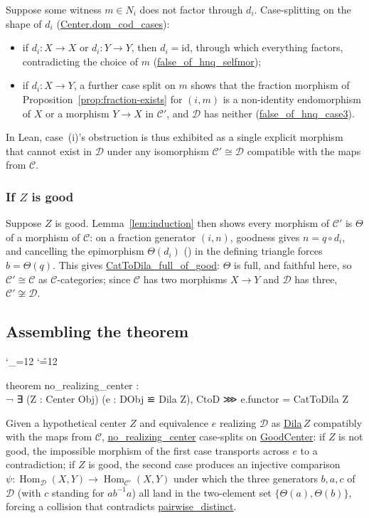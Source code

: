 \documentclass[11pt]{amsart}
\newcommand{\lc}[1]{\url{#1}}
\newenvironment{leancode}{%
  \begingroup
  \catcode`\_=12\relax
  \catcode`\^=12\relax
  \small\ttfamily\raggedright\baselineskip=1.15\baselineskip
  \par\smallskip\noindent
}{%
  \par\smallskip
  \endgroup
}
\theoremstyle{plain}
\theoremstyle{definition}
\theoremstyle{remark}
\newcommand{\calC}{\mathcal C}
\newcommand{\calD}{\mathcal D}
\newcommand{\id}{\mathrm{id}}
\DeclareMathOperator{\Hom}{Hom}
\begin{document}
Suppose some witness $m \in N_i$ does not factor through $d_i$. Case-splitting on the shape
of $d_i$ (\lc{Center.dom_cod_cases}):
\begin{itemize}
\item if $d_i : X\to X$ or $d_i:Y\to Y$, then $d_i = \id$, through which everything factors,
  contradicting the choice of $m$ (\lc{false_of_hnq_selfmor});
\item if $d_i : X \to Y$, a further case split on $m$ shows that the fraction morphism of
  Proposition~\ref{prop:fraction-exists} for $(i,m)$ is a non-identity endomorphism of $X$
  or a morphism $Y \to X$ in $\calC'$, and $\calD$ has neither (\lc{false_of_hnq_case3}).
\end{itemize}
In Lean, case~(i)'s obstruction is thus exhibited as a single explicit morphism that cannot
exist in $\calD$ under any isomorphism $\calC' \cong \calD$ compatible with the maps from
$\calC$.

\subsubsection{If $Z$ is good}

Suppose $Z$ is good. Lemma~\ref{lem:induction} then shows every morphism of $\calC'$ is
$\Theta$ of a morphism of $\calC$: on a fraction generator $(i,n)$, goodness gives
$n = q \circ d_i$, and cancelling the epimorphism $\Theta(d_i)$
(\citep[Proposition~3.3]{Mayeux}) in the defining triangle forces $b = \Theta(q)$. This
gives \lc{CatToDila_full_of_good}: $\Theta$ is full, and faithful here, so
$\calC' \cong \calC$ as $\calC$-categories; since $\calC$ has two morphisms $X \to Y$ and
$\calD$ has three, $\calC' \not\cong \calD$.

\subsection{Assembling the theorem}

\begin{leancode}
theorem no_realizing_center : \\
    ¬ ∃ (Z : Center Obj) (e : DObj ≌ Dila Z), CtoD ⋙ e.functor = CatToDila Z \\
\end{leancode}
Given a hypothetical center $Z$ and equivalence $e$ realizing $\calD$ as \lc{Dila}$\,Z$
compatibly with the maps from $\calC$, \lc{no_realizing_center} case-splits on
\lc{GoodCenter}: if $Z$ is not good, the impossible morphism of the first case transports
across $e$ to a contradiction; if $Z$ is good, the second case produces an injective
comparison $\psi : \Hom_\calD(X,Y) \to \Hom_{\calC'}(X,Y)$ under which the three generators
$b,a,c$ of $\calD$ (with $c$ standing for $ab^{-1}a$) all land in the two-element set
$\{\Theta(a),\Theta(b)\}$, forcing a collision that contradicts \lc{pairwise_distinct}.
\end{document}
